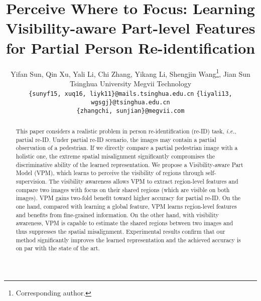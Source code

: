 \documentclass[10pt,twocolumn,letterpaper]{article}
\begin{document}
\title{Perceive Where to Focus: Learning Visibility-aware Part-level Features\\ for Partial Person Re-identification}

\author{Yifan Sun, Qin Xu, Yali Li, Chi Zhang, Yikang Li, Shengjin Wang\thanks{Corresponding author.},  Jian Sun\\
{Tsinghua University}          
{Megvii Technology}\\
{\texttt{\small{\{sunyf15, xuq16, liyk11\}@mails.tsinghua.edu.cn}} \hspace{0.5cm}}
{\texttt{\small{\{liyali13, wgsgj\}@tsinghua.edu.cn}}\hspace{0.5cm}}\\
{\texttt{\small{\{zhangchi, sunjian\}@megvii.com}}}
}



\maketitle


\begin{abstract}


This paper considers a realistic problem in person re-identification (re-ID) task, \emph{i.e.}, partial re-ID. Under partial re-ID scenario, the images may contain a partial observation of a pedestrian. 
If we directly compare a partial pedestrian image with a holistic one, the extreme spatial misalignment significantly compromises the discriminative ability of the learned representation. We propose a Visibility-aware Part Model (VPM), which learns to perceive the visibility of regions through self-supervision. The visibility awareness allows VPM to extract region-level features and compare two images with focus on their shared regions (which are visible on both images). 
VPM gains two-fold benefit toward higher accuracy for partial re-ID. On the one hand, compared with learning a global feature, VPM learns region-level features and benefits from fine-grained information. On the other hand, with visibility awareness, VPM is capable to estimate the shared regions between two images and thus suppresses the spatial misalignment. Experimental results confirm that our method significantly improves the learned representation and the achieved accuracy is on par with the state of the art. 

\end{abstract}
\end{document}
